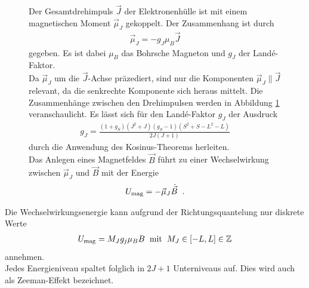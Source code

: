 \documentclass[]{scrartcl}
\begin{document}
\begin{figure}[H]
\begin{minipage}[t]{0.38\textwidth}
\label{fig:veranschaulichungdrehimpuls}
\end{minipage}
\hfill
\begin{minipage}[t]{0.6\textwidth}
\vspace{0pt}
Der Gesamtdrehimpuls $\vec{J}$ der Elektronenhülle ist mit einem magnetischen Moment $\vec{\mu}_J$ gekoppelt. Der Zusammenhang ist durch
\begin{align}
\vec{\mu}_J=-g_J\mu_B \vec{J}
\end{align}
gegeben. Es ist dabei $\mu_B$ das Bohrsche Magneton und $g_J$ der Landé-Faktor.\\
Da $\vec{\mu}_J$ um die $\vec{J}$-Achse präzediert, sind nur die Komponenten $\vec{\mu}_J  	\parallel  \vec{J}$ relevant, da die senkrechte Komponente sich heraus mittelt. Die Zusammenhänge zwischen den Drehimpulsen werden in Abbildung \ref{fig:veranschaulichungdrehimpuls} veranschaulicht.
Es lässt sich für den Landé-Faktor $g_J$ der Ausdruck
\begin{align}
g_J= \frac{\left(1+g_S\right)\left(J^2+J\right) \left(g_S-1\right)\left(S^2+S-L^2-L\right)}{2J\left(J+1\right)}
\end{align}
durch die Anwendung des Kosinus-Theorems herleiten.\\
Das Anlegen eines Magnetfeldes $\vec{B}$ führt zu einer Wechselwirkung zwischen $\vec{\mu}_J$ und $\vec{B}$ mit der Energie
\begin{align}
U_\text{mag}=-\vec{\mu}_J\dot{\vec{B}} \hspace{0.2cm}\text{.}
\end{align}
\end{minipage}
\end{figure}
Die Wechselwirkungsenergie kann aufgrund der Richtungsquantelung nur diskrete Werte
\begin{align}
U_\text{mag}=M_J g_j\mu_B B \hspace{0.2cm}\text{mit} \hspace{0.2cm}M_J \in  \left[-L,L\right]\in \mathbb{Z}
\end{align}
annehmen.\\
Jedes Energieniveau spaltet folglich in $2J+1$ Unterniveaus auf. Dies wird auch als Zeeman-Effekt bezeichnet.
\end{document}

